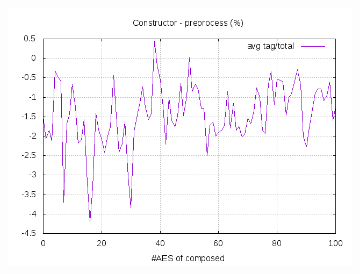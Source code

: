 \documentclass[10pt,a4paper]{article}
\begin{document}
\begin{figure}[h]
\begin{subfigure}[t]{0.3\textwidth}
        \includegraphics[width=\textwidth]{const_preprocess_frac}
        \caption{}
    \end{subfigure}


\end{figure}
\end{document}
